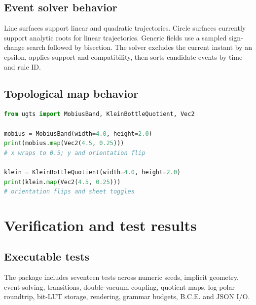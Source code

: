 \documentclass[10.5pt,a4paper,openany]{book}
\begin{document}
\section{Event solver behavior}
Line surfaces support linear and quadratic trajectories. Circle surfaces currently support analytic roots for linear trajectories. Generic fields use a sampled sign-change search followed by bisection. The solver excludes the current instant by an epsilon, applies support and compatibility, then sorts candidate events by time and rule ID.

\section{Topological map behavior}
\begin{lstlisting}[language=Python,caption={Explicit quotient maps}]
from ugts import MobiusBand, KleinBottleQuotient, Vec2

mobius = MobiusBand(width=4.0, height=2.0)
print(mobius.map(Vec2(4.5, 0.25)))
# x wraps to 0.5; y and orientation flip

klein = KleinBottleQuotient(width=4.0, height=2.0)
print(klein.map(Vec2(4.5, 0.25)))
# orientation flips and sheet toggles
\end{lstlisting}

\chapter{Verification and test results}
\section{Executable tests}
The package includes seventeen tests across numeric seeds, implicit geometry, event solving, transitions, double-vacuum coupling, quotient maps, log-polar roundtrip, bit-LUT storage, rendering, grammar budgets, B.C.E. and JSON I/O.


\end{document}
